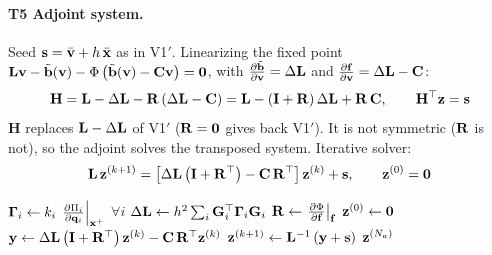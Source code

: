 \paragraph{T5 Adjoint system.}\mbox{}
\newline Seed $\mathbf{s} = \bar{\mathbf{v}} + h\,\bar{\mathbf{x}}$ as in V1$'$. Linearizing the fixed point $\mathbf{L}\mathbf{v} - \tilde{\mathbf{b}}(\mathbf{v}) - \Phi\left(\tilde{\mathbf{b}}(\mathbf{v}) - \mathbf{C}\mathbf{v}\right) = \mathbf{0}$, with $\frac{\partial \tilde{\mathbf{b}}}{\partial \mathbf{v}} = \Delta\mathbf{L}$ and $\frac{\partial \mathbf{f}}{\partial \mathbf{v}} = \Delta\mathbf{L} - \mathbf{C}$:
\begin{equation*}
    \mathbf{H} = \mathbf{L} - \Delta\mathbf{L} - \mathbf{R}\left(\Delta\mathbf{L} - \mathbf{C}\right) = \mathbf{L} - \left(\mathbf{I} + \mathbf{R}\right)\Delta\mathbf{L} + \mathbf{R}\,\mathbf{C},
    \qquad
    \mathbf{H}^\top\mathbf{z} = \mathbf{s}
\end{equation*}
$\mathbf{H}$ replaces $\mathbf{L} - \Delta\mathbf{L}$ of V1$'$ ($\mathbf{R} = \mathbf{0}$ gives back V1$'$). It is not symmetric ($\R$ is not), so the adjoint solves the transposed system. Iterative solver:
\begin{equation*}
    \mathbf{L}\,\mathbf{z}^{(k+1)} = \left[\Delta\mathbf{L}\left(\mathbf{I} + \mathbf{R}^\top\right) - \mathbf{C}\,\mathbf{R}^\top\right]\mathbf{z}^{(k)} + \mathbf{s},
    \qquad
    \mathbf{z}^{(0)} = \mathbf{0}
\end{equation*}
\begin{algorithm}[H]
\caption{V2: adjoint solve for one step (changes from Alg.~\ref{alg:npd_v1_adjoint}: $\R$, local step).}
\label{alg:npd_v2_adjoint}
\begin{algorithmic}[1]
    \State $\boldsymbol{\Gamma}_i \gets k_i\,\left.\frac{\partial \Pi_i}{\partial \mathbf{q}_i}\right|_{\mathbf{x}^+}$ \quad $\forall i$
    \State $\Delta\mathbf{L} \gets h^2\sum_i \mathbf{G}_i^\top\boldsymbol{\Gamma}_i\mathbf{G}_i$ 
    \State $\mathbf{R} \gets \left.\frac{\partial \Phi}{\partial \mathbf{f}}\right|_{\mathbf{f}}$ 
    \State $\mathbf{z}^{(0)} \gets \mathbf{0}$
        \State $\mathbf{y} \gets \Delta\mathbf{L}\left(\mathbf{I} + \mathbf{R}^\top\right)\mathbf{z}^{(k)} - \mathbf{C}\,\mathbf{R}^\top\mathbf{z}^{(k)}$ 
        \State $\mathbf{z}^{(k+1)} \gets \mathbf{L}^{-1}\left(\mathbf{y} + \mathbf{s}\right)$ 
    \EndFor
    \State \Return $\mathbf{z}^{(N_a)}$
\EndFunction
\end{algorithmic}
\end{algorithm}

